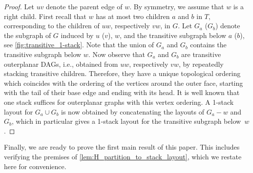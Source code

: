 \documentclass{article}
\begin{document}
\begin{proof}
    Let $ uv $ denote the parent edge of $ w $.
    By symmetry, we assume that $ w $ is a right child.
    First recall that $ w $ has at most two children $ a $ and $ b $ in $ T $, corresponding to the children of $ uw $, respectively $ vw $, in $ G $.
    Let $ G_a $ ($ G_b$) denote the subgraph of $ G $ induced by $ u $ ($ v $), $ w $, and the transitive subgraph below $ a $ ($ b $), see \cref{fig:transitive_1-stack}.
    Note that the union of $ G_a $ and $ G_b $ contains the transitive subgraph below $ w $.
    Now observe that $ G_a $ and $ G_b $ are transitive outerplanar DAGs, i.e., obtained from $ uw $, respectively $ vw $, by repeatedly stacking transitive children.
    Therefore, they have a unique topological ordering which coincides with the ordering of the vertices around the outer face, starting with the tail of their base edge and ending with its head.
    It is well known that one stack suffices for outerplanar graphs with this vertex ordering.
    A 1-stack layout for $ G_a \cup G_b $ is now obtained by concatenating the layouts of $ G_a - w $ and $ G_b $, which in particular gives a 1-stack layout for the transitive subgraph below~$ w $.
\end{proof}

\medskip

Finally, we are ready to prove the first main result of this paper.
This includes verifying the premises of \cref{lem:H_partition_to_stack_layout}, which we restate here for convenience.

\HPartitionToStackLayout*

\outerplanarBounded*
\end{document}
